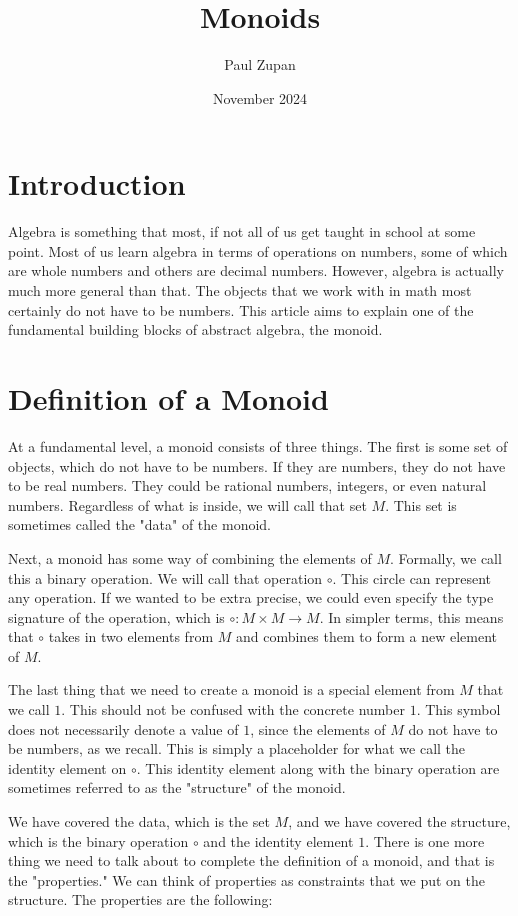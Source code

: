 \documentclass{article}
\title{Monoids}
\author{Paul Zupan}
\date{November 2024}
\begin{document}
\maketitle

\section{Introduction}

Algebra is something that most, if not all of us get taught in school at some
point. Most of us learn algebra in terms of operations on numbers, some of
which are whole numbers and others are decimal numbers. However, algebra is
actually much more general than that. The objects that we work with in math
most certainly do not have to be numbers. This article aims to explain one of
the fundamental building blocks of abstract algebra, the monoid.

\section{Definition of a Monoid}

At a fundamental level, a monoid consists of three things. The first is some
set of objects, which do not have to be numbers. If they are numbers, they do
not have to be real numbers. They could be rational numbers, integers, or even
natural numbers. Regardless of what is inside, we will call that set $M$. This
set is sometimes called the "data" of the monoid.

Next, a monoid has some way of combining the elements of $M$. Formally, we call
this a binary operation. We will call that operation $\circ$. This circle can
represent any operation. If we wanted to be extra precise, we could even
specify the type signature of the operation, which is $\circ : M \times M \to
M$. In simpler terms, this means that $\circ$ takes in two elements from $M$
and combines them to form a new element of $M$.

The last thing that we need to create a monoid is a special element from $M$
that we call $1$. This should not be confused with the concrete number $1$.
This symbol does not necessarily denote a value of $1$, since the elements of
$M$ do not have to be numbers, as we recall. This is simply a placeholder for
what we call the identity element on $\circ$. This identity element along with
the binary operation are sometimes referred to as the "structure" of the
monoid.

We have covered the data, which is the set $M$, and we have covered the
structure, which is the binary operation $\circ$ and the identity element $1$.
There is one more thing we need to talk about to complete the definition of a
monoid, and that is the "properties." We can think of properties as constraints
that we put on the structure. The properties are the following:
\end{document}

